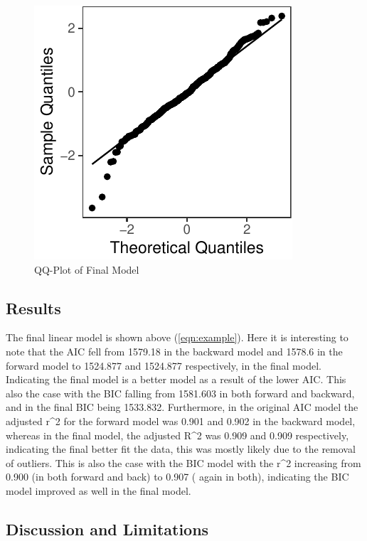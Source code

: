 \documentclass[a4paper,8pt,twocolumn,twoside,]{pinp}
\begin{document}
\begin{figure}

{\centering \includegraphics{CC05E4-FinalReport_files/figure-latex/qqres-1} 

}

\caption{QQ-Plot of Final Model}\label{fig:qqres}
\end{figure}

\hypertarget{results}{%
\subsection{Results}\label{results}}

The final linear model is shown above (\ref{eqn:example}). Here it is
interesting to note that the AIC fell from 1579.18 in the backward model
and 1578.6 in the forward model to 1524.877 and 1524.877 respectively,
in the final model. Indicating the final model is a better model as a
result of the lower AIC. This also the case with the BIC falling from
1581.603 in both forward and backward, and in the final BIC being
1533.832. Furthermore, in the original AIC model the adjusted r\^{}2 for
the forward model was 0.901 and 0.902 in the backward model, whereas in
the final model, the adjusted R\^{}2 was 0.909 and 0.909 respectively,
indicating the final better fit the data, this was mostly likely due to
the removal of outliers. This is also the case with the BIC model with
the r\^{}2 increasing from 0.900 (in both forward and back) to 0.907 (
again in both), indicating the BIC model improved as well in the final
model.

\hypertarget{discussion-and-limitations}{%
\subsection{Discussion and
Limitations}\label{discussion-and-limitations}}
\end{document}
